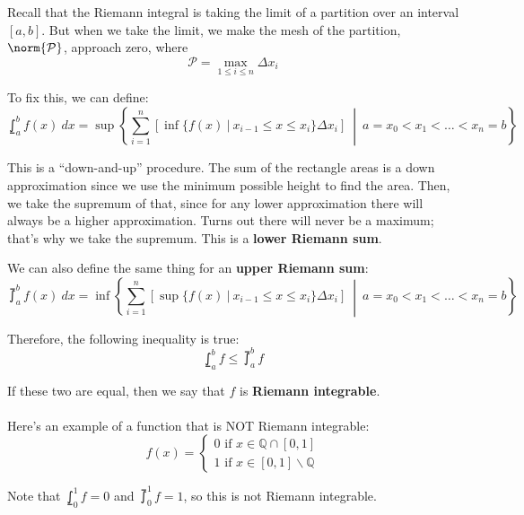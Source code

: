 \documentclass[12pt]{article}
\begin{document}
Recall that the Riemann integral is taking the limit of a partition over an interval $[a,b]$. But when we take the limit, we make the mesh of the partition, $\norm{\mathcal{P}}$, approach zero, where \[ \mathcal{P} = \max_{1 \le i \le n}{\Delta x_i} \]

To fix this, we can define: \[ \lowint_a^b f(x) \ dx = \sup\left\{ \sum_{i=1}^n[\inf\{f(x) \ | \ x_{i-1} \le x \le x_i \}\Delta x_i] \ \middle| \ a = x_0 < x_1 < \dots < x_n = b\right\} \] 

This is a ``down-and-up'' procedure. The sum of the rectangle areas is a down approximation since we use the minimum possible height to find the area. Then, we take the supremum of that, since for any lower approximation there will always be a higher approximation. Turns out there will never be a maximum; that's why we take the supremum. This is a \textbf{lower Riemann sum}.

We can also define the same thing for an \textbf{upper Riemann sum}: \[ \upint_a^b f(x) \ dx = \inf\left\{ \sum_{i=1}^n[\sup\{f(x) \ | \ x_{i-1} \le x \le x_i \}\Delta x_i] \ \middle| \ a = x_0 < x_1 < \dots < x_n = b\right\} \]

Therefore, the following inequality is true: \[ \lowint_a^b f \le \upint_a^b f \]

If these two are equal, then we say that $f$ is \textbf{Riemann integrable}. \\ \\

Here's an example of a function that is NOT Riemann integrable:
\[ f(x) = 
\begin{cases}
0 \text{ if } x \in \mathbb{Q} \cap [0,1] \\
1 \text{ if } x \in [0,1]\backslash \mathbb{Q}
\end{cases}
\]

Note that $\lowint_0^1 f = 0$ and $\upint_0^1 f = 1$, so this is not Riemann integrable.
\end{document}
